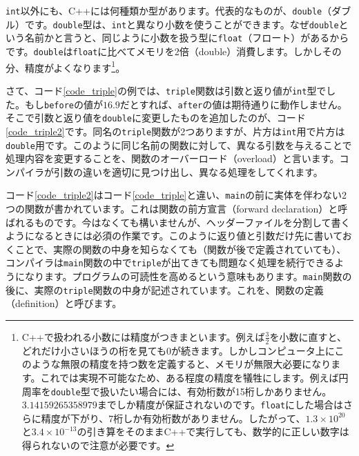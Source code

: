 \texttt{int}以外にも、C++には何種類か型があります。代表的なものが、\texttt{double}（ダブル）です。\texttt{double}型は、\texttt{int}と異なり小数を使うことができます。なぜ\texttt{double}という名前かと言うと、同じように小数を扱う型に\texttt{float}（フロート）があるからです。\texttt{double}は\texttt{float}に比べてメモリを2倍（double）消費します。しかしその分、精度がよくなります\footnote{C++で扱われる小数には精度がつきまといます。例えば$\frac{3}{2}$を小数に直すと、どれだけ小さいほうの桁を見ても0が続きます。しかしコンピュータ上にこのような無限の精度を持つ数を定義すると、メモリが無限大必要になります。これでは実現不可能なため、ある程度の精度を犠牲にします。例えば円周率を\texttt{double}型で扱いたい場合には、有効桁数が15桁しかありません。 $3.14159265358979$までしか精度が保証されないのです。\texttt{float}にした場合はさらに精度が下がり、7桁しか有効桁数がありません。したがって、$1.3\times10^{20}$と$3.4\times10^{-13}$の引き算をそのままC++で実行しても、数学的に正しい数字は得られないので注意が必要です。}。

さて、コード\ref{code_triple}の例では、\texttt{triple}関数は引数と返り値が\texttt{int}型でした。もし\texttt{before}の値が$16.9$だとすれば、\texttt{after}の値は期待通りに動作しません。そこで引数と返り値を\texttt{double}に変更したものを追加したのが、コード\ref{code_triple2}です。同名の\texttt{triple}関数が2つありますが、片方は\texttt{int}用で片方は\texttt{double}用です。このように同じ名前の関数に対して、異なる引数を与えることで処理内容を変更することを、関数のオーバーロード（overload）と言います。コンパイラが引数の違いを適切に見つけ出し、異なる処理をしてくれます。



コード\ref{code_triple2}はコード\ref{code_triple}と違い、\texttt{main}の前に実体を伴わない2つの関数が書かれています。これは関数の前方宣言（forward declaration）と呼ばれるものです。今はなくても構いませんが、ヘッダーファイルを分割して書くようになるときには必須の作業です。このように返り値と引数だけ先に書いておくことで、実際の関数の中身を知らなくても（関数が後で定義されていても）、コンパイラは\texttt{main}関数の中で\texttt{triple}が出てきても問題なく処理を続行できるようになります。プログラムの可読性を高めるという意味もあります。\texttt{main}関数の後に、実際の\texttt{triple}関数の中身が記述されています。これを、関数の定義（definition）と呼びます。

